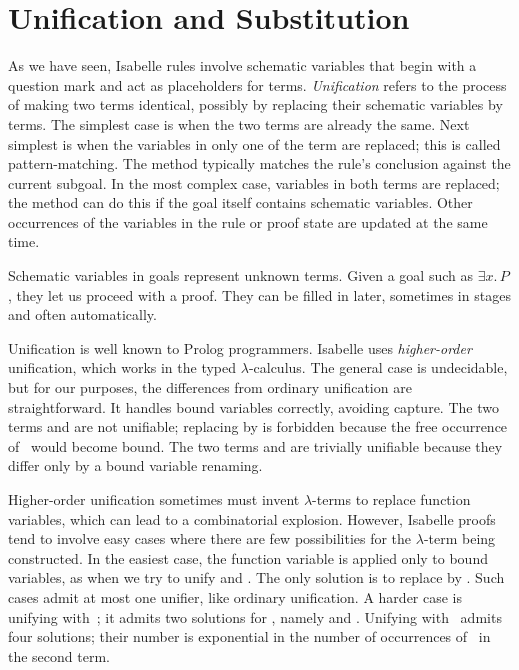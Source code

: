 \section{Unification and Substitution}\label{sec:unification}

%
As we have seen, Isabelle rules involve schematic variables that begin with
a question mark and act as
placeholders for terms.  \emph{Unification} refers to  the process of
making two terms identical, possibly by replacing their schematic variables by
terms.  The simplest case is when the two terms  are already the same. Next
simplest is when the variables in only one of the term
 are replaced; this is called pattern-matching.  The
 method typically  matches the rule's conclusion
against the current subgoal.  In the most complex case,  variables in both
terms are replaced; the  method can do this if the goal
itself contains schematic variables.  Other occurrences of the variables in
the rule or proof state are updated at the same time.

Schematic variables in goals represent unknown terms.  Given a goal such
as $\exists x.\,P$, they let us proceed with a proof.  They can be 
filled in later, sometimes in stages and often automatically. 

Unification is well known to Prolog programmers. Isabelle uses
\emph{higher-order} unification, which works in the
typed $\lambda$-calculus.  The general case is
undecidable, but for our purposes, the differences from ordinary
unification are straightforward.  It handles bound  variables
correctly, avoiding capture.  The two terms  and
  are not unifiable; replacing  by
 is forbidden because the free occurrence of~ would become
bound.  The two terms
 and  are
trivially unifiable because they differ only by a bound variable renaming.

\begin{warn}
Higher-order unification sometimes must invent
$\lambda$-terms to replace function  variables,
which can lead to a combinatorial explosion. However,  Isabelle proofs tend
to involve easy cases where there are few possibilities for the
$\lambda$-term being constructed. In the easiest case, the
function variable is applied only to bound variables, 
as when we try to unify  and
.  The only solution is to replace
 by .  Such cases admit at most
one unifier, like ordinary unification.  A harder case is
unifying  with~; it admits two solutions for ,
namely  and . 
Unifying  with~ admits four solutions; their number is
exponential in the number of occurrences of~ in the second term.
\end{warn}


